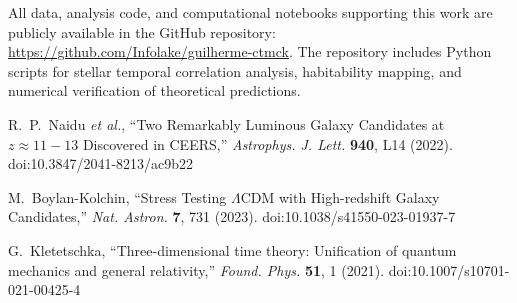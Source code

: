 \documentclass[reprint,amsmath,amssymb,aps,prd,nofootinbib]{revtex4-2}
\begin{document}
\noindent All data, analysis code, and computational notebooks supporting this work are publicly available in the GitHub repository: \url{https://github.com/Infolake/guilherme-ctmck}. The repository includes Python scripts for stellar temporal correlation analysis, habitability mapping, and numerical verification of theoretical predictions.

\begin{thebibliography}{99}

R.~P.~Naidu \textit{et al.},
``Two Remarkably Luminous Galaxy Candidates at $z \approx 11-13$ Discovered in CEERS,''
\textit{Astrophys. J. Lett.} \textbf{940}, L14 (2022).
doi:10.3847/2041-8213/ac9b22

M.~Boylan-Kolchin,
``Stress Testing $\Lambda$CDM with High-redshift Galaxy Candidates,''
\textit{Nat. Astron.} \textbf{7}, 731 (2023).
doi:10.1038/s41550-023-01937-7

G.~Kletetschka,
``Three-dimensional time theory: Unification of quantum mechanics and general relativity,''
\textit{Found. Phys.} \textbf{51}, 1 (2021).
doi:10.1007/s10701-021-00425-4

\end{thebibliography}
\end{document}
